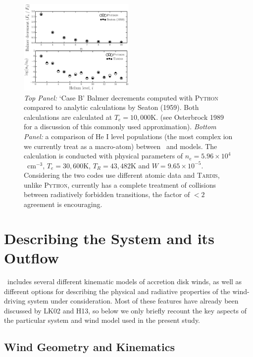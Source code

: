 \documentclass[preprint, a4paper, 11pt]{aastex}
\begin{document}
\begin{figure}
\centering
\includegraphics[width=0.5\textwidth]{figures/fig_caseb_tardis.eps}
\caption{
{\sl Top Panel:} `Case B' Balmer decrements computed 
with \textsc{Python} compared to analytic calculations
by Seaton (1959). Both calculations are calculated at $T_e=10,000$K.
(see Osterbrock 1989 for a discussion of this commonly used approximation).
{\sl Bottom Panel:}  a comparison of He I level populations (the most complex ion we currently 
treat as a macro-atom) between \py\ and \tar models. 
The calculation is conducted with physical parameters of $n_e=5.96\times10^4$~cm$^{-3}$,
$T_e=30,600$K, $T_R=43,482$K and $W=9.65\times10^{-5}$. 
Considering the two codes use different atomic data and \textsc{Tardis,} unlike \textsc{Python,} currently has a complete treatment of collisions between 
radiatively forbidden transitions, the factor of 
$<2$ agreement is encouraging. 
}
\label{tests}
\end{figure}


\nocite{osterbrock}
\nocite{seaton1959}

%
%

\section{Describing the System and its Outflow}

\py\ includes several different kinematic models of accretion disk
winds, as well as different options for describing the physical and
radiative properties of the wind-driving system under
consideration. Most of these features have already been discussed by
LK02 and H13, so below we only briefly recount the key aspects of the
particular system and wind model used in the present study.

\subsection{Wind Geometry and Kinematics}
\label{kinematics}
\end{document}
